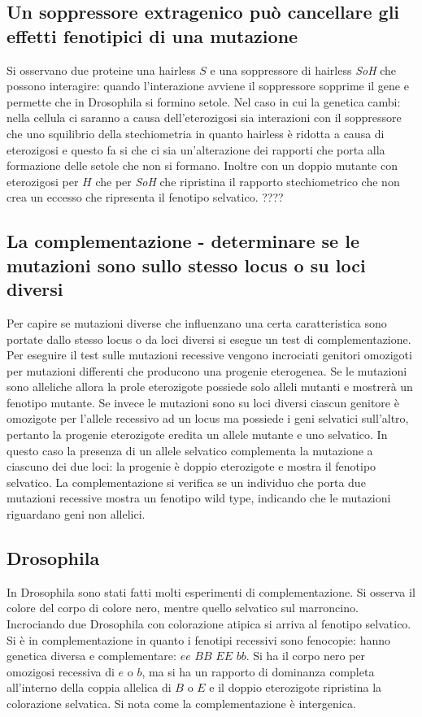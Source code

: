 \subsection{Un soppressore extragenico pu\`o cancellare gli effetti fenotipici di una mutazione}
Si osservano due proteine una hairless $S$ e una soppressore di hairless \emph{SoH} che possono interagire: quando l'interazione avviene il soppressore sopprime il gene e permette
che in Drosophila si formino setole. Nel caso in cui la genetica cambi: nella cellula ci saranno a causa dell'eterozigosi sia interazioni con il soppressore che uno 
squilibrio della stechiometria in quanto hairless \`e ridotta a causa di eterozigosi e questo fa si che ci sia un'alterazione dei rapporti che porta alla formazione delle setole che 
non si formano. Inoltre con un doppio mutante con eterozigosi per $H$ che per \emph{SoH} che ripristina il rapporto stechiometrico che non crea un eccesso che ripresenta il 
fenotipo selvatico. ????
\subsection{La complementazione - determinare se le mutazioni sono sullo stesso locus o su loci diversi}
Per capire se mutazioni diverse che influenzano una certa caratteristica sono portate dallo stesso locus o da loci diversi si esegue un test di complementazione. Per eseguire il test sulle mutazioni 
recessive vengono incrociati genitori omozigoti per mutazioni differenti che producono una progenie eterogenea. Se le mutazioni sono alleliche allora la prole eterozigote possiede solo alleli mutanti
e mostrer\`a un fenotipo mutante. Se invece le mutazioni sono su loci diversi ciascun genitore \`e omozigote per l'allele recessivo ad un locus ma possiede i geni selvatici sull'altro, pertanto 
la progenie eterozigote eredita un allele mutante e uno selvatico. In questo caso la presenza di un allele selvatico complementa la mutazione a ciascuno dei due loci: la progenie \`e doppio eterozigote
e mostra il fenotipo selvatico. La complementazione si verifica se un individuo che porta due mutazioni recessive mostra un fenotipo wild type, indicando che le mutazioni riguardano geni non allelici. 
\subsection{Drosophila}
In Drosophila sono stati fatti molti esperimenti di complementazione. Si osserva il colore del corpo di colore nero, mentre quello selvatico sul marroncino. Incrociando due 
Drosophila con colorazione atipica si arriva al fenotipo selvatico. Si \`e in complementazione in quanto i fenotipi recessivi sono fenocopie: hanno genetica diversa e complementare:
$ee$ $BB$ $EE$ $bb$. Si ha il corpo nero per omozigosi recessiva di $e$ o $b$, ma si ha un rapporto di dominanza completa all'interno della coppia allelica di $B$ o $E$ e il doppio 
eterozigote ripristina la colorazione selvatica. Si nota come la complementazione \`e intergenica. 
